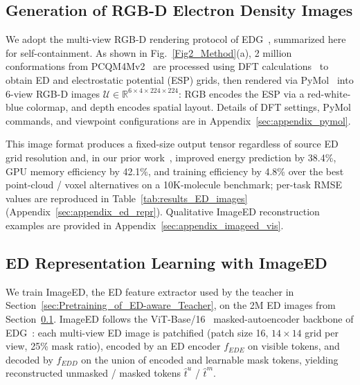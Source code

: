 \subsection{Generation of RGB-D Electron Density Images}
\label{sec:Generation_ED_Image}

We adopt the multi-view RGB-D rendering protocol of EDG~\cite{xiang2025edg}, summarized here for self-containment. As shown in Fig.~\ref{Fig2_Method}(a), 2 million conformations from PCQM4Mv2~\cite{hu2021ogb} are processed using DFT calculations~\cite{turney2012psi4} to obtain ED and electrostatic potential (ESP) grids, then rendered via PyMol~\cite{delano2002pymol} into 6-view RGB-D images $\mathcal{U}\in\mathbb{R}^{6\times 4\times 224\times 224}$: RGB encodes the ESP via a red-white-blue colormap, and depth encodes spatial layout. Details of DFT settings, PyMol commands, and viewpoint configurations are in Appendix~\ref{sec:appendix_pymol}.

This image format produces a fixed-size output tensor regardless of source ED grid resolution and, in our prior work~\cite{xiang2025edg}, improved energy prediction by 38.4\%, GPU memory efficiency by 42.1\%, and training efficiency by 4.8\% over the best point-cloud / voxel alternatives on a 10K-molecule benchmark; per-task RMSE values are reproduced in Table~\ref{tab:results_ED_images} (Appendix~\ref{sec:appendix_ed_repr}). Qualitative ImageED reconstruction examples are provided in Appendix~\ref{sec:appendix_imageed_vis}.

\subsection{ED Representation Learning with ImageED}
\label{sec:ED_representation_learning}

We train ImageED, the ED feature extractor used by the teacher in Section~\ref{sec:Pretraining_of_ED-aware_Teacher}, on the 2M ED images from Section~\ref{sec:Generation_ED_Image}. ImageED follows the ViT-Base/16~\cite{dosovitskiy2020image} masked-autoencoder backbone of EDG~\cite{xiang2025edg}: each multi-view ED image is patchified (patch size 16, $14\times 14$ grid per view, 25\% mask ratio), encoded by an ED encoder $f_{EDE}$ on visible tokens, and decoded by $f_{EDD}$ on the union of encoded and learnable mask tokens, yielding reconstructed unmasked / masked tokens $\hat{t}^u$ / $\hat{t}^m$.

